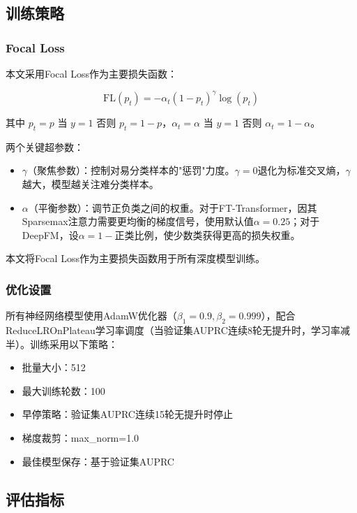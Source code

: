 


\subsection{训练策略}

\subsubsection{Focal Loss}

本文采用Focal Loss作为主要损失函数\cite{lin2017focal}：

\begin{equation}
\text{FL}(p_t) = -\alpha_t (1 - p_t)^\gamma \log(p_t)
\end{equation}

其中 $p_t = p$ 当 $y=1$ 否则 $p_t = 1-p$，$\alpha_t = \alpha$ 当 $y=1$ 否则 $\alpha_t = 1-\alpha$。

两个关键超参数：
\begin{itemize}
    \item $\gamma$（聚焦参数）：控制对易分类样本的"惩罚"力度。$\gamma=0$退化为标准交叉熵，$\gamma$越大，模型越关注难分类样本。
    \item $\alpha$（平衡参数）：调节正负类之间的权重。对于FT-Transformer，因其Sparsemax注意力需要更均衡的梯度信号，使用默认值$\alpha=0.25$；对于DeepFM，设$\alpha = 1 - \text{正类比例}$，使少数类获得更高的损失权重。
\end{itemize}

本文将Focal Loss作为主要损失函数用于所有深度模型训练。

\subsubsection{优化设置}

所有神经网络模型使用AdamW优化器（$\beta_1=0.9, \beta_2=0.999$），配合ReduceLROnPlateau学习率调度（当验证集AUPRC连续8轮无提升时，学习率减半）。训练采用以下策略：
\begin{itemize}
    \item 批量大小：512
    \item 最大训练轮数：100
    \item 早停策略：验证集AUPRC连续15轮无提升时停止
    \item 梯度裁剪：max\_norm=1.0
    \item 最佳模型保存：基于验证集AUPRC
\end{itemize}

\subsection{评估指标}

